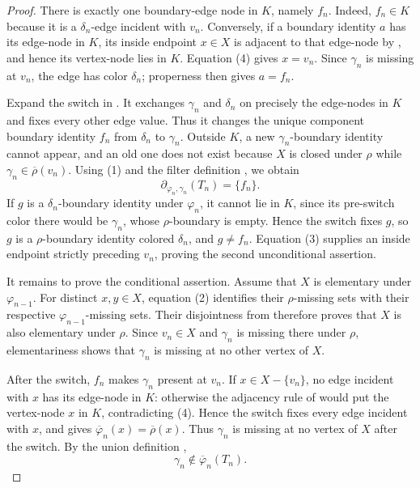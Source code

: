 \begin{proof}
There is exactly one boundary-edge node in \(K\), namely \(f_n\).  Indeed,
\(f_n\in K\) because it is a \(\delta_n\)-edge incident with \(v_n\).
Conversely, if a boundary identity \(a\) has its edge-node in \(K\), its
inside endpoint \(x\in X\) is adjacent to that edge-node by
, and hence its vertex-node lies in
\(K\).  Equation (4) gives \(x=v_n\).  Since \(\gamma_n\) is missing at
\(v_n\), the edge has color \(\delta_n\); properness then gives
\(a=f_n\).

Expand the switch in .  It exchanges
\(\gamma_n\) and \(\delta_n\) on precisely the edge-nodes in \(K\) and
fixes every other edge value.  Thus it changes the unique component
boundary identity \(f_n\) from \(\delta_n\) to \(\gamma_n\).  Outside
\(K\), a new \(\gamma_n\)-boundary identity cannot appear, and an old one
does not exist because \(X\) is closed under \(\rho\) while
\(\gamma_n\in\overline\rho(v_n)\).  Using (1) and the filter definition
, we obtain
\[
 \partial_{\varphi_n,\gamma_n}(T_n)=\{f_n\}.                      \tag{5}
\]
If \(g\) is a \(\delta_n\)-boundary identity under \(\varphi_n\), it
cannot lie in \(K\), since its pre-switch color there would be
\(\gamma_n\), whose \(\rho\)-boundary is empty.  Hence the switch fixes
\(g\), so \(g\) is a \(\rho\)-boundary identity colored \(\delta_n\),
and \(g\ne f_n\).  Equation (3) supplies an inside endpoint strictly
preceding \(v_n\), proving the second unconditional assertion.

It remains to prove the conditional assertion.  Assume that \(X\) is
elementary under \(\varphi_{n-1}\).  For distinct \(x,y\in X\), equation
(2) identifies their \(\rho\)-missing sets with their respective
\(\varphi_{n-1}\)-missing sets.  Their disjointness from
 therefore proves that \(X\) is also
elementary under \(\rho\).  Since \(v_n\in X\) and \(\gamma_n\) is
missing there under \(\rho\), elementariness shows that \(\gamma_n\) is
missing at no other vertex of \(X\).

After the switch, \(f_n\) makes \(\gamma_n\) present at \(v_n\).  If
\(x\in X-\{v_n\}\), no edge incident with \(x\) has its edge-node in
\(K\): otherwise the adjacency rule of 
would put the vertex-node \(x\) in \(K\), contradicting (4).  Hence the
switch fixes every edge incident with \(x\), and
 gives
\(\overline\varphi_n(x)=\overline\rho(x)\).  Thus \(\gamma_n\) is
missing at no vertex of \(X\) after the switch.  By the union definition
,
\[
 \gamma_n\notin\overline\varphi_n(T_n).                           \tag{6}
\]


\end{proof}
